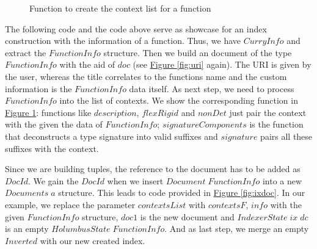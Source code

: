 \documentclass[%
	pdftex,%
	a4paper,%
	oneside,%
	chapterprefix,%
	headsepline,%
	12pt%
]{scrbook}
\makeatletter
\newcommand{\Conid}[1]{\mathit{#1}}
\newcommand{\Varid}[1]{\mathit{#1}}
\newcommand{\anonymous}{\kern0.06em \vbox{\hrule\@width.5em}}
\def\resethooks{%
  \global\let\SaveRestoreHook\empty
  \global\let\ColumnHook\empty}
\newcommand{\hsindent}[1]{\quad}%
\makeatother
\begin{document}
\begin{figure}[h]
\resethooks
\caption{Function to create the context list for a function}
\label{fig:contextf}
\end{figure}

The following code and the code above serve as showcase for an index construction with
the information of a function. %
Thus, we have \ensuremath{\Conid{CurryInfo}} and extract the \ensuremath{\Conid{FunctionInfo}} structure. %
Then we build an document of the type \ensuremath{\Conid{FunctionInfo}} with the aid of
\ensuremath{\Varid{doc}} (see \hyperref[fig:uri]{Figure \ref{fig:uri}} again). %
The URI is given by the user, whereas the title correlates to the
functions name and the custom information is the \ensuremath{\Conid{FunctionInfo}} data
itself. %
As next step, we need to process \ensuremath{\Conid{FunctionInfo}} into the list of
contexts. %
We show the corresponding function in \hyperref[fig:contextf]{Figure
  \ref{fig:contextf}}: %
functions like \ensuremath{\Varid{description}}, \ensuremath{\Varid{flexRigid}} and \ensuremath{\Varid{nonDet}} just pair the
context with the given the data of \ensuremath{\Conid{FunctionInfo}}; %
\ensuremath{\Varid{signatureComponents}} is the function that deconstructs a type
signature into valid suffixes and \ensuremath{\Varid{signature}} pairs all these suffixes
with the context. %

Since we are building tuples, the reference to the document has to be
added as \ensuremath{\Conid{DocId}}. %
We gain the \ensuremath{\Conid{DocId}} when we insert \ensuremath{\Conid{Document}\;\Conid{FunctionInfo}} into a new
\ensuremath{\Conid{Documents}\;\Varid{a}} structure. %
This leads to code provided in \hyperref[fig:ixdoc]{Figure
  \ref{fig:ixdoc}}. %
In our example, we replace the parameter \ensuremath{\Varid{contextsList}} with
\ensuremath{\Varid{contextsF}}, \ensuremath{\Varid{info}} with the given \ensuremath{\Conid{FunctionInfo}} structure, \ensuremath{\Varid{doc1}} is
the new document and \ensuremath{\Conid{IndexerState}\;\Varid{ix}\;\Varid{dc}} is an empty \ensuremath{\Conid{HolumbusState}\;\Conid{FunctionInfo}}. %
And as last step, we merge an empty \ensuremath{\Conid{Inverted}} with our new created
index.
\end{document}
